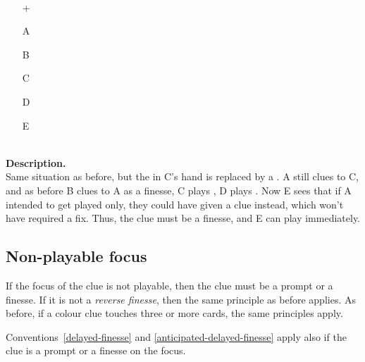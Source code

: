 \begin{example}	\hfill \\
	\begin{minipage}{0.45\textwidth}
		\begin{itemize}
			\item[\Large +]      
			\item[\Large A]    
			\item[\Large B]    
			\item[\Large C]    
			\item[\Large D]    
			\item[\Large E]    
		\end{itemize}
	\end{minipage}%
	\begin{minipage}{0.55\textwidth}
		\hfill \\
		
		\textbf{Description.} \\
		
		Same situation as before, but the  in C's hand is replaced by a . A still clues  to C, and as before B clues  to A as a finesse, C plays , D plays . Now E sees that if A intended to get  played only, they could have given a  clue instead, which won't have required a fix. Thus, the  clue must be a finesse, and E can play  immediately.
	\end{minipage}
\end{example} \vspace{0.15 cm}

\subsection{Non-playable focus}

If the focus of the clue is not playable, then the clue must be a prompt or a finesse. If it is not a \emph{reverse finesse}, then the same principle as before applies. As before, if a colour clue touches three or more cards, the same principles apply.

\begin{convention}
	Conventions~\ref{delayed-finesse} and \ref{anticipated-delayed-finesse} apply also if the clue is a prompt or a finesse on the focus.
\end{convention}

